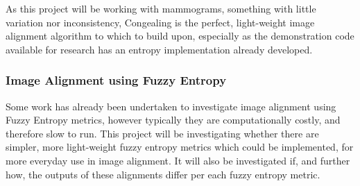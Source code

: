 As this project will be working with mammograms, something with little variation nor inconsistency, Congealing is the perfect, light-weight image alignment algorithm to which to build upon, especially as the demonstration code available for research has an entropy implementation already developed.

\subsubsection{Image Alignment using Fuzzy Entropy}

Some work has already been undertaken to investigate image alignment using Fuzzy Entropy metrics, however typically they are computationally costly, and therefore slow to run. This project will be investigating whether there are simpler, more light-weight fuzzy entropy metrics which could be implemented, for more everyday use in image alignment. It will also be investigated if, and further how, the outputs of these alignments differ per each fuzzy entropy metric.
